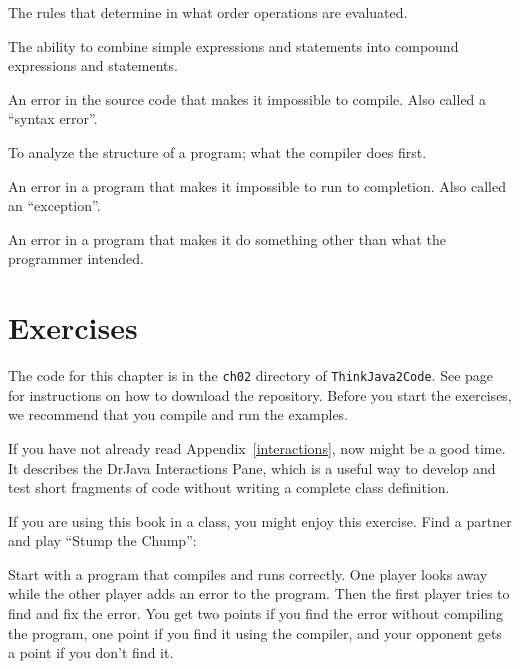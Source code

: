 \begin{description}
The rules that determine in what order operations are evaluated.

The ability to combine simple expressions and statements into compound expressions and statements.

An error in the source code that makes it impossible to compile.
Also called a ``syntax error''.

To analyze the structure of a program; what the compiler does first.

An error in a program that makes it impossible to run to completion.
Also called an ``exception''.

An error in a program that makes it do something other than what the programmer intended.


\end{description}


\section{Exercises}

The code for this chapter is in the {\tt ch02} directory of {\tt ThinkJava2Code}.
See page~\pageref{code} for instructions on how to download the repository.
Before you start the exercises, we recommend that you compile and run the examples.

If you have not already read Appendix~\ref{interactions}, now might be a good time.
It describes the DrJava Interactions Pane, which is a useful way to develop and test short fragments of code without writing a complete class definition.


\begin{exercise}

If you are using this book in a class, you might enjoy this exercise.
Find a partner and play ``Stump the Chump'':

Start with a program that compiles and runs correctly.
One player looks away while the other player adds an error to the program.
Then the first player tries to find and fix the error.
You get two points if you find the error without compiling the program, one point if you find it using the compiler, and your opponent gets a point if you don't find it.

\end{exercise}


